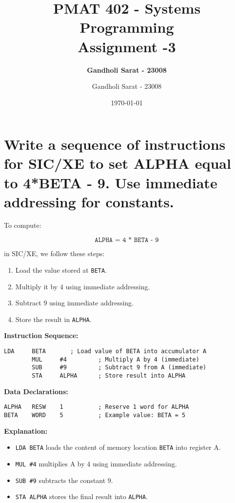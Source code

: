 \documentclass[12pt]{article}
\title{\textbf{PMAT 402 - Systems Programming \\ Assignment -3 }}
\author{\textbf{Gandholi Sarat - 23008}}
\author{Gandholi Sarat - 23008}
\date{\today}
\begin{document}
\renewcommand{\thesection}{Q\arabic{section}}


\maketitle
\tableofcontents
\newpage


\section{Write a sequence of instructions for SIC/XE to set ALPHA equal to 4*BETA - 9. Use immediate addressing for constants.}

To compute:

\[
\texttt{ALPHA = 4 * BETA - 9}
\]

in SIC/XE, we follow these steps:

\begin{enumerate}
    \item Load the value stored at \texttt{BETA}.
    \item Multiply it by 4 using immediate addressing.
    \item Subtract 9 using immediate addressing.
    \item Store the result in \texttt{ALPHA}.
\end{enumerate}

\textbf{Instruction Sequence:}

\begin{lstlisting}[language={[x86masm]Assembler}]
        LDA     BETA       ; Load value of BETA into accumulator A
        MUL     #4         ; Multiply A by 4 (immediate)
        SUB     #9         ; Subtract 9 from A (immediate)
        STA     ALPHA      ; Store result into ALPHA
\end{lstlisting}

\textbf{Data Declarations:}

\begin{lstlisting}[language={[x86masm]Assembler}]
ALPHA   RESW    1          ; Reserve 1 word for ALPHA
BETA    WORD    5          ; Example value: BETA = 5
\end{lstlisting}

\textbf{Explanation:}

\begin{itemize}
    \item \texttt{LDA BETA} loads the content of memory location \texttt{BETA} into register A.
    \item \texttt{MUL \#4} multiplies A by 4 using immediate addressing.
    \item \texttt{SUB \#9} subtracts the constant 9.
    \item \texttt{STA ALPHA} stores the final result into \texttt{ALPHA}.
\end{itemize}
\end{document}
